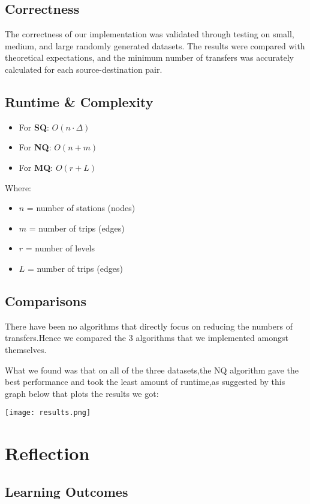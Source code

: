 \documentclass[a4paper,12pt]{article}
\begin{document}
\subsection{Correctness}
The correctness of our implementation was validated through testing on small, medium, and large randomly generated datasets. The results were compared with theoretical expectations, and the minimum number of transfers was accurately calculated for each source-destination pair.

\subsection{Runtime \& Complexity}
\begin{itemize}
    \item For \textbf{SQ}: \(O(n \cdot \Delta)\)
    \item For \textbf{NQ}: \(O(n + m)\)
    \item For \textbf{MQ}: \(O(r + L)\)
\end{itemize}
Where:
\begin{itemize}
    \item \(n\) = number of stations (nodes)
    \item \(m\) = number of trips (edges)
    \item \(r\) = number of levels
    \item \(L\) = number of trips (edges)
\end{itemize}

\subsection{Comparisons}
There have been no algorithms that directly focus on reducing the numbers of transfers.Hence we compared the 3 algorithms that we implemented amongst themselves.

What we found was that on all of the three datasets,the NQ algorithm gave the best performance and took the least amount of runtime,as suggested by this graph below that plots the results we got:

\texttt{[image: results.png]} 



\section{Reflection}


\subsection{Learning Outcomes}
\end{document}

